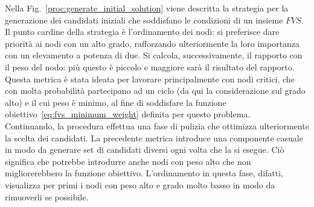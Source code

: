 \documentclass[a4paper, 10pt]{article}
\begin{document}
\noindent
Nella Fig.~\ref{proc:generate_initial_solution} viene descritta la strategia per la generazione dei candidati iniziali che soddisfano le condizioni di un insieme $FVS$. Il punto cardine della strategia è l'ordinamento dei nodi: si preferisce dare priorità ai nodi con un alto grado, rafforzando ulteriormente la loro importanza con un elevamento a potenza di due. Si calcola, successivamente, il rapporto con il peso del nodo: più questo è piccolo e maggiore sarà il risultato del rapporto. Questa metrica è stata ideata per lavorare principalmente con nodi critici, che con molta probabilità partecipano ad un ciclo (da qui la considerazione sul grado alto) e il cui peso è minimo, al fine di soddisfare la funzione obiettivo~\eqref{eq:fvs_minimum_weight} definita per questo problema.  \\
Continuando, la procedura effettua una fase di pulizia che ottimizza ulteriormente la scelta dei candidati. La precedente metrica introduce una componente casuale in modo da generare set di candidati diversi ogni volta che la si esegue. Ciò significa che potrebbe introdurre anche nodi con peso alto che non migliorerebbero la funzione obiettivo. L'ordinamento in questa fase, difatti, visualizza per primi i nodi con peso alto e grado molto basso in modo da rimuoverli se possibile.
\end{document}
